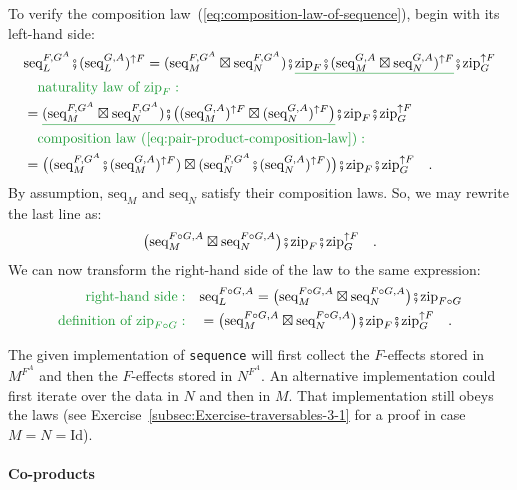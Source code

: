 To verify the composition law~(\ref{eq:composition-law-of-sequence}),
begin with its left-hand side:
\begin{align*}
 & \text{seq}_{L}^{F,G^{A}}\bef(\text{seq}_{L}^{G,A})^{\uparrow F}=(\text{seq}_{M}^{F,G^{A}}\boxtimes\text{seq}_{N}^{F,G^{A}})\bef\gunderline{\text{zip}_{F}\bef(\text{seq}_{M}^{G,A}\boxtimes\text{seq}_{N}^{G,A})^{\uparrow F}}\bef\text{zip}_{G}^{\uparrow F}\\
 & \quad{\color{greenunder}\text{naturality law of }\text{zip}_{F}:}\quad\\
 & =\gunderline{(\text{seq}_{M}^{F,G^{A}}\boxtimes\text{seq}_{N}^{F,G^{A}})\bef\big((\text{seq}_{M}^{G,A})^{\uparrow F}\boxtimes(\text{seq}_{N}^{G,A})^{\uparrow F}\big)}\bef\text{zip}_{F}\bef\text{zip}_{G}^{\uparrow F}\\
 & \quad{\color{greenunder}\text{composition law~(\ref{eq:pair-product-composition-law})}:}\quad\\
 & =\big((\text{seq}_{M}^{F,G^{A}}\bef(\text{seq}_{M}^{G,A})^{\uparrow F})\boxtimes(\text{seq}_{N}^{F,G^{A}}\bef(\text{seq}_{N}^{G,A})^{\uparrow F})\big)\bef\text{zip}_{F}\bef\text{zip}_{G}^{\uparrow F}\quad.
\end{align*}
By assumption, $\text{seq}_{M}$ and $\text{seq}_{N}$ satisfy their
composition laws. So, we may rewrite the last line as:
\[
\big(\text{seq}_{M}^{F\circ G,A}\boxtimes\text{seq}_{N}^{F\circ G,A}\big)\bef\text{zip}_{F}\bef\text{zip}_{G}^{\uparrow F}\quad.
\]
We can now transform the right-hand side of the law to the same expression:
\begin{align*}
{\color{greenunder}\text{right-hand side}:}\quad & \text{seq}_{L}^{F\circ G,A}=\big(\text{seq}_{M}^{F\circ G,A}\boxtimes\text{seq}_{N}^{F\circ G,A}\big)\bef\text{zip}_{F\circ G}\\
{\color{greenunder}\text{definition of }\text{zip}_{F\circ G}:}\quad & =\big(\text{seq}_{M}^{F\circ G,A}\boxtimes\text{seq}_{N}^{F\circ G,A}\big)\bef\text{zip}_{F}\bef\text{zip}_{G}^{\uparrow F}\quad.
\end{align*}

The given implementation of \lstinline!sequence! will first collect
the $F$-effects stored in $M^{F^{A}}$ and then the $F$-effects
stored in $N^{F^{A}}$. An alternative implementation could first
iterate over the data in $N$ and then in $M$. That implementation
still obeys the laws (see Exercise~\ref{subsec:Exercise-traversables-3-1}
for a proof in case $M=N=\text{Id}$).

\paragraph{Co-products}

